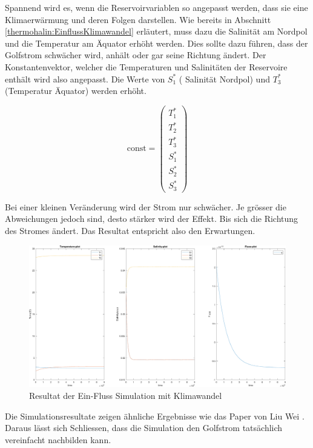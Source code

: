 Spannend wird es, wenn die Reservoirvariablen so angepasst werden, dass sie eine Klimaerwärmung und deren Folgen darstellen. Wie bereits in Abschnitt \ref{thermohalin:EinflussKlimawandel} erläutert, muss dazu die Salinität am Nordpol und die Temperatur am Äquator erhöht werden. Dies sollte dazu führen, dass der Golfstrom schwächer wird, anhält oder gar seine Richtung ändert. 
Der Konstantenvektor, welcher die Temperaturen und Salinitäten der Reservoire enthält wird also angepasst.
Die Werte von $S_1^*$ ( Salinität Nordpol) und $T_3^*$ (Temperatur Äquator) werden erhöht.

\begin{equation*}
\text{const} = \begin{pmatrix}T_{1}^{*} \\ T_{2}^{*} \\ T_{3}^{*} \\ S_{1}^{*} \\ S_{2}^{*} \\ S_{3}^{*}\end{pmatrix}
\end{equation*}



Bei einer kleinen Veränderung wird der Strom nur schwächer. Je grösser die Abweichungen jedoch sind, desto stärker wird der Effekt.
Bis sich die Richtung des Stromes ändert.
Das Resultat entspricht also den Erwartungen. 

\begin{figure}
	\centering
	\includegraphics[width=14cm]{thermohalin/Code/graphs/3b1f-skript-klimawandel.pdf}
	\caption{Resultat der Ein-Fluss Simulation mit Klimawandel}
	\label{thermohalin:3b1f-skript-klimawandel}
\end{figure}
Die Simulationsresultate zeigen ähnliche Ergebnisse wie das Paper von Liu Wei \cite{thermohalin:liuwei}. Daraus lässt sich Schliessen, dass die Simulation den Golfstrom tatsächlich vereinfacht nachbilden kann.


